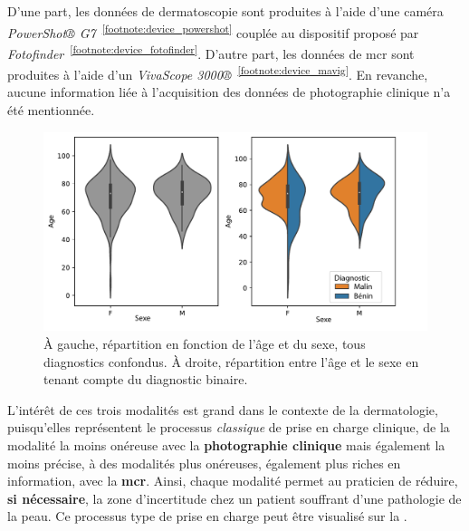 D'une part, les données de dermatoscopie sont produites à l'aide d'une caméra \textit{PowerShot® G7}~\textsuperscript{\ref{footnote:device_powershot}} couplée au dispositif proposé par \textit{Fotofinder}~\textsuperscript{\ref{footnote:device_fotofinder}}. D'autre part, les données de \gls{mcr} sont produites à l'aide d'un \textit{VivaScope 3000®}~\textsuperscript{\ref{footnote:device_mavig}}. En revanche, aucune information liée à l'acquisition des données de photographie clinique n'a été mentionnée.\par

\begin{figure}[H]
    \centering
    \includegraphics[width=\linewidth]{contents/chapter_4/resources/statistics_age_sex.pdf}
    \caption{À gauche, répartition en fonction de l'âge et du sexe, tous diagnostics confondus. À droite, répartition entre l'âge et le sexe en tenant compte du diagnostic binaire.}
    \label{fig:statistics_age_sex}
\end{figure}\par

L'intérêt de ces trois modalités est grand dans le contexte de la dermatologie, puisqu'elles représentent le processus \textit{classique} de prise en charge clinique, de la modalité la moins onéreuse avec la \textbf{photographie clinique} mais également la moins précise, à des modalités plus onéreuses, également plus riches en information, avec la \textbf{\gls{mcr}}. Ainsi, chaque modalité permet au praticien de réduire, \textbf{si nécessaire}, la zone d'incertitude chez un patient souffrant d'une pathologie de la peau. Ce processus type de prise en charge peut être visualisé sur la .\par

